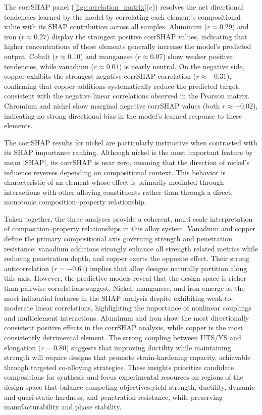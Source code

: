 The corrSHAP panel (\autoref{fig:correlation_matrix}(c)) resolves the net directional tendencies learned by the model by correlating each element's compositional value with its SHAP contribution across all samples. Aluminum ($r \approx 0.29$) and iron ($r \approx 0.27$) display the strongest positive corrSHAP values, indicating that higher concentrations of these elements generally increase the model's predicted output. Cobalt ($r \approx 0.10$) and manganese ($r \approx 0.07$) show weaker positive tendencies, while vanadium ($r \approx 0.04$) is nearly neutral. On the negative side, copper exhibits the strongest negative corrSHAP correlation ($r \approx -0.31$), confirming that copper additions systematically reduce the predicted target, consistent with the negative linear correlations observed in the Pearson matrix. Chromium and nickel show marginal negative corrSHAP values (both $r \approx -0.02$), indicating no strong directional bias in the model's learned response to these elements.

The corrSHAP results for nickel are particularly instructive when contrasted with its SHAP importance ranking. Although nickel is the most important feature by mean $|\text{SHAP}|$, its corrSHAP is near zero, meaning that the direction of nickel's influence reverses depending on compositional context. This behavior is characteristic of an element whose effect is primarily mediated through interactions with other alloying constituents rather than through a direct, monotonic composition--property relationship.


Taken together, the three analyses provide a coherent, multi scale interpretation of composition--property relationships in this alloy system. Vanadium and copper define the primary compositional axis governing strength and penetration resistance: vanadium additions strongly enhance all strength related metrics while reducing penetration depth, and copper exerts the opposite effect. Their strong anticorrelation ($r = -0.61$) implies that alloy designs naturally partition along this axis. However, the predictive models reveal that the design space is richer than pairwise correlations suggest. Nickel, manganese, and iron emerge as the most influential features in the SHAP analysis despite exhibiting weak-to-moderate linear correlations, highlighting the importance of nonlinear couplings and multielement interactions. Aluminum and iron show the most directionally consistent positive effects in the corrSHAP analysis, while copper is the most consistently detrimental element. The strong coupling between UTS/YS and elongation ($r = 0.80$) suggests that improving ductility while maintaining strength will require designs that promote strain-hardening capacity, achievable through targeted co-alloying strategies. These insights prioritize candidate compositions for synthesis and focus experimental resources on regions of the design space that balance competing objectives:yield strength, ductility, dynamic and quasi-static hardness, and penetration resistance, while preserving manufacturability and phase stability.


